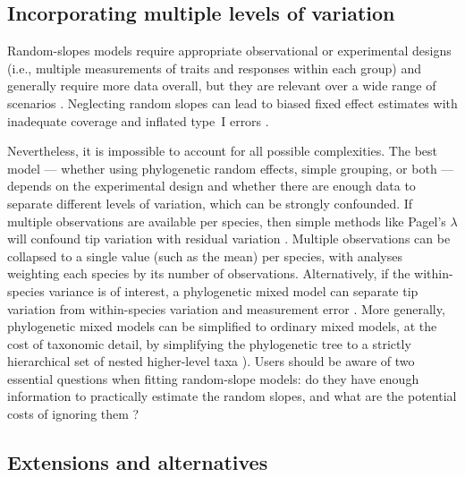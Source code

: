 \documentclass[12pt]{article}
\begin{document}
\subsection*{Incorporating multiple levels of variation}

Random-slopes models require appropriate observational or experimental designs (i.e., multiple measurements of traits and responses within each group) and generally require more data overall, but they are relevant over a wide range of scenarios \citep{schielzeth2008conclusions, cleasby2015quantifying,ord2010adaptation}.
Neglecting random slopes can lead to biased fixed effect estimates with inadequate coverage and inflated type~I errors \citep{schielzeth2008conclusions}.

Nevertheless, it is impossible to account for all possible complexities.
The best model --- whether using phylogenetic random effects, simple grouping, or both --- depends on the experimental design and whether there are enough data to separate different levels of variation, which can be strongly confounded.
If multiple observations are available per species, then simple methods like Pagel's $\lambda$ will confound tip variation with residual variation \citep{boettiger2013is}.
Multiple observations can be collapsed to a single value (such as the mean) per species, with analyses weighting each species by its number of observations.
Alternatively, if the within-species variance is of interest, a phylogenetic mixed model can separate tip variation from within-species variation and measurement error \citep{kostikova2016bridging}.
More generally, phylogenetic mixed models can be simplified to ordinary mixed models, at the cost of taxonomic detail, by simplifying the phylogenetic tree to a strictly hierarchical set of nested higher-level taxa \citep{bunnefeld2012island}). 
Users should be aware of two essential questions when fitting random-slope models: do they have enough information to practically estimate the random slopes, and what are the potential costs of ignoring them \citep{schielzeth2008conclusions}? 

\subsection*{Extensions and alternatives}
\end{document}
